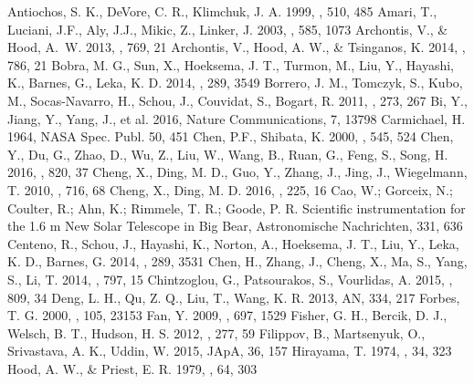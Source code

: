 \documentclass[12pt,preprint]{aastex}
\begin{document}
\begin{CJK*}{UTF8}{gbsn}
\begin{thebibliography}{}
 Antiochos, S. K., DeVore, C. R., Klimchuk, J. A. 1999, \apj, 510, 485
 Amari, T., Luciani, J.F., Aly, J.J., Mikic, Z., Linker, J. 2003, \apj, 585, 1073
 Archontis, V., \& Hood, A.~W. 2013, \apjl, 769, 21
 Archontis, V., Hood, A. W., \& Tsinganos, K. 2014, \apjl, 786, 21
 Bobra, M. G., Sun, X., Hoeksema, J. T., Turmon, M., Liu, Y., Hayashi, K., Barnes, G., Leka, K. D. 2014, \solphys, 289, 3549
 Borrero, J. M., Tomczyk, S., Kubo, M., Socas-Navarro, H., Schou, J., Couvidat, S., Bogart, R. 2011, \solphys, 273, 267
 Bi, Y., Jiang, Y., Yang, J., et al. 2016, Nature Communications, 7, 13798
 Carmichael, H. 1964, NASA Spec. Publ. 50, 451
  Chen, P.F., Shibata, K. 2000, \apj, 545, 524
 Chen, Y., Du, G., Zhao, D., Wu, Z., Liu, W., Wang, B., Ruan, G., Feng, S., Song, H. 2016, \apj, 820, 37
 Cheng, X., Ding, M. D., Guo, Y., Zhang, J., Jing, J., Wiegelmann, T. 2010, \apj, 716, 68
 Cheng, X., Ding, M. D. 2016, \apjs, 225, 16
 Cao, W.; Gorceix, N.; Coulter, R.; Ahn, K.; Rimmele, T. R.; Goode, P. R. Scientific instrumentation for the 1.6 m New Solar Telescope in Big Bear, Astronomische Nachrichten, 331, 636
 Centeno, R., Schou, J., Hayashi, K., Norton, A., Hoeksema, J. T., Liu, Y., Leka, K. D., Barnes, G. 2014, \solphys, 289, 3531
 Chen, H., Zhang, J., Cheng, X., Ma, S., Yang, S., Li, T. 2014, \apjl, 797, 15
 Chintzoglou, G., Patsourakos, S., Vourlidas, A. 2015, \apj, 809, 34
 Deng, L. H., Qu, Z. Q., Liu, T., Wang, K. R. 2013, AN, 334, 217
 Forbes, T. G. 2000, \jgr, 105, 23153
 Fan, Y. 2009, \apj, 697, 1529
  Fisher, G. H., Bercik, D. J., Welsch, B. T., Hudson, H. S. 2012, \solphys, 277, 59
 Filippov, B., Martsenyuk, O., Srivastava, A. K., Uddin, W. 2015, JApA, 36, 157
 Hirayama, T. 1974, \solphys, 34, 323
 Hood, A. W., \& Priest, E. R. 1979, \solphys, 64, 303

\end{thebibliography}
\end{CJK*}
\end{document}
